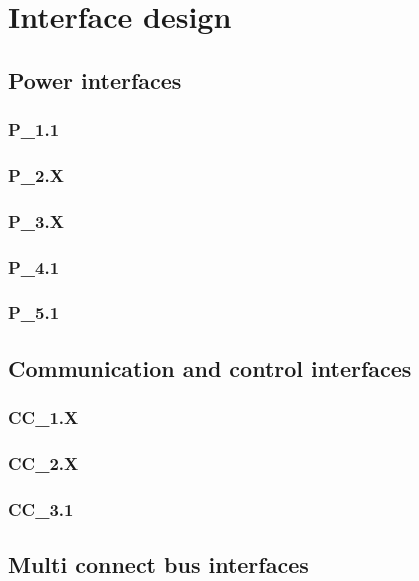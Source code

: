 \documentclass[Main]{subfiles}
\begin{document}
\section{Interface design}

\subsection{Power interfaces}

\subsubsection{P\_1.1}


\subsubsection{P\_2.X}


\subsubsection{P\_3.X}


\subsubsection{P\_4.1}


\subsubsection{P\_5.1}



\subsection{Communication and control interfaces}

\subsubsection{CC\_1.X}


\subsubsection{CC\_2.X}


\subsubsection{CC\_3.1}



\subsection{Multi connect bus interfaces}
\end{document}
